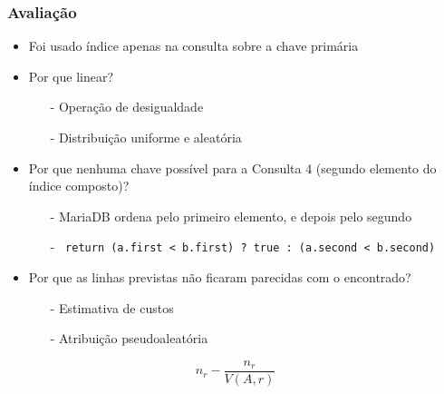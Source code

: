 \documentclass[10pt]{beamer}
\begin{document}
\begin{frame}[fragile]
  \frametitle{Avaliação}

  \begin{itemize}

    \item Foi usado índice apenas na consulta sobre a chave primária

    \item Por que linear?
      \begin{itemize}
        \item[-] Operação de desigualdade
        \item[-] Distribuição uniforme e aleatória 
      \end{itemize}

    \item Por que nenhuma chave possível para a Consulta 4 (segundo elemento do índice composto)?
    \begin{itemize}
        \item[-] MariaDB ordena pelo primeiro elemento, e depois pelo segundo
        \item[-] \texttt{ return (a.first < b.first) ? true : (a.second < b.second)}
      \end{itemize}

    \item Por que as linhas previstas não ficaram parecidas com o encontrado?
    \begin{itemize}
      \item[-] Estimativa de custos
      \item[-] Atribuição pseudoaleatória 
    \end{itemize}

  \end{itemize}

  \begin{equation}
  n_r - \dfrac{n_r}{V(A,r)} \nonumber
  \end{equation}

\end{frame}
\end{document}

